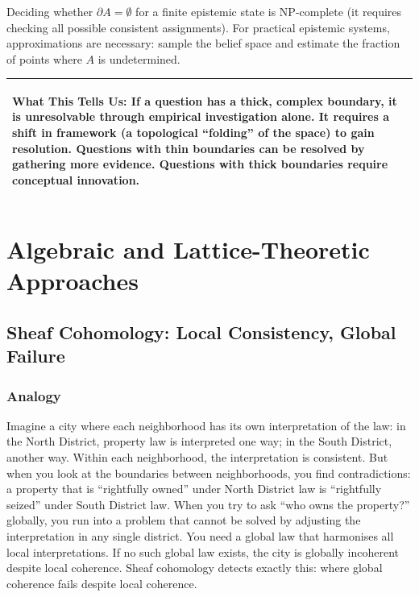 \documentclass[11pt,letterpaper]{article}
\theoremstyle{definition}
\theoremstyle{remark}
\newenvironment{insightbox}{%
  \vspace{0.3cm}%
  \noindent\begin{tabular}{|p{\dimexpr\textwidth-4\tabcolsep-2\arrayrulewidth}|}
  \hline
  \small\itshape\color{accent}
}{%
  \\ \hline
  \end{tabular}
  \vspace{0.3cm}
}
\begin{document}
Deciding whether $\partial A = \emptyset$ for a finite epistemic state is NP-complete (it requires checking all possible consistent assignments). For practical epistemic systems, approximations are necessary: sample the belief space and estimate the fraction of points where $A$ is undetermined.

\begin{insightbox}
\textbf{What This Tells Us:} If a question has a thick, complex boundary, it is unresolvable through empirical investigation alone. It requires a shift in framework (a topological ``folding'' of the space) to gain resolution. Questions with thin boundaries can be resolved by gathering more evidence. Questions with thick boundaries require conceptual innovation.
\end{insightbox}

\newpage

\section{Algebraic and Lattice-Theoretic Approaches}
\label{sec:algebraic}

\subsection{Sheaf Cohomology: Local Consistency, Global Failure}
\label{sec:sheaf}

\subsubsection*{Analogy}

Imagine a city where each neighborhood has its own interpretation of the law: in the North District, property law is interpreted one way; in the South District, another way. Within each neighborhood, the interpretation is consistent. But when you look at the boundaries between neighborhoods, you find contradictions: a property that is ``rightfully owned'' under North District law is ``rightfully seized'' under South District law. When you try to ask ``who owns the property?'' globally, you run into a problem that cannot be solved by adjusting the interpretation in any single district. You need a global law that harmonises all local interpretations. If no such global law exists, the city is globally incoherent despite local coherence. Sheaf cohomology detects exactly this: where global coherence fails despite local coherence.
\end{document}
